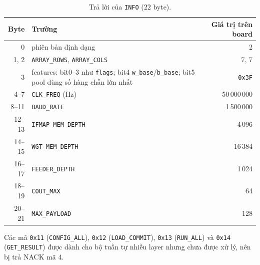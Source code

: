 \begin{table}[H]\centering
\caption{Trả lời của \texttt{INFO} ($22$ byte).}\label{tab:pl-info}
\footnotesize\setlength{\tabcolsep}{4pt}
\begin{tabular}{@{}r>{\raggedright\arraybackslash}p{10.5cm}r@{}}
\toprule
Byte & Trường & Giá trị trên board \\ \midrule
0 & phiên bản định dạng & 2 \\
1, 2 & \texttt{ARRAY\_ROWS}, \texttt{ARRAY\_COLS} & 7, 7 \\
3 & features: bit0--3 như \texttt{flags}; bit4 \texttt{w\_base}/\texttt{b\_base}; bit5 pool dùng số hàng chẵn lớn nhất & \texttt{0x3F} \\
4--7 & \texttt{CLK\_FREQ} (Hz) & 50\,000\,000 \\
8--11 & \texttt{BAUD\_RATE} & 1\,500\,000 \\
12--13 & \texttt{IFMAP\_MEM\_DEPTH} & 4\,096 \\
14--15 & \texttt{WGT\_MEM\_DEPTH} & 16\,384 \\
16--17 & \texttt{FEEDER\_DEPTH} & 1\,024 \\
18--19 & \texttt{COUT\_MAX} & 64 \\
20--21 & \texttt{MAX\_PAYLOAD} & 128 \\ \bottomrule
\end{tabular}
\end{table}

Các mã \texttt{0x11} (\texttt{CONFIG\_ALL}), \texttt{0x12} (\texttt{LOAD\_COMMIT}), \texttt{0x13} (\texttt{RUN\_ALL}) và \texttt{0x14} (\texttt{GET\_RESULT}) được dành cho bộ tuần tự nhiều layer nhưng chưa được xử lý, nên bị trả NACK mã $4$.
